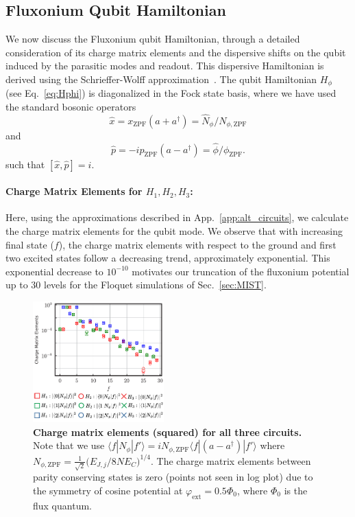 \documentclass[%
reprint,
superscriptaddress,
 amsmath,amssymb,
 aps,
 prx,
longbibliography,
floatfix,
]{revtex4-2}
\newcommand{\sh}[1]{{\color{blue}{{}[SS: #1]}}}%
\begin{document}
\subsection{Fluxonium Qubit Hamiltonian}
\sh{check for units to be $\hbar=1$}
We now discuss the Fluxonium qubit Hamiltonian, through a detailed consideration of its charge matrix elements and the dispersive shifts on the qubit induced by the parasitic modes and readout. This dispersive Hamiltonian is derived using the Schrieffer-Wolff approximation~\cite{viola2015collective}. The qubit Hamiltonian $H_{\phi}$ (see Eq.~\ref{eq:Hphi}) is diagonalized in the Fock state basis, where we have used the standard bosonic operators
 \begin{equation} \hat x=x_{\mathrm{ZPF}}(a+a^\dagger)=\hat N_{\phi}/ N_{\phi,\mathrm{ZPF}}
 \end{equation}
 and 
 \begin{equation} \hat p=-ip_{\mathrm{ZPF}}(a-a^\dagger)=\hat \phi/\phi_{\mathrm{ZPF}}.
 \end{equation}
such that $[\hat x,\hat p]=i$.
\paragraph{Charge Matrix Elements for $H_1,H_2,H_3$:}
Here, using the approximations described in App.~\ref{app:alt_circuits}, we calculate the charge matrix elements for the qubit mode. We observe that with increasing final state ($f$), the charge matrix elements with respect to the ground and first two excited states follow a decreasing trend, approximately exponential. This exponential decrease to $10^{-10}$ motivates our truncation of the fluxonium potential up to $30$ levels for the Floquet simulations of Sec.~\ref{sec:MIST}.
\begin{figure}[hbt]
    \centering
\includegraphics[width=0.45\textwidth]{Supp_Fig/Charge_Matrix.pdf}
    \caption{{\bf Charge matrix 
 elements (squared) for all three circuits.} Note that we use $\langle f|N_\phi|f'\rangle=iN_{\phi,\mathrm{ZPF}}\langle f|(a-a^\dagger)|f'\rangle$ where $N_{\phi,\mathrm{ZPF}}=\frac{1}{\sqrt{2}}\Big(E_{J,j}/8NE_C\Big)^{1/4}$. The charge matrix elements between parity conserving states is zero (points not seen in log plot) due to the symmetry of cosine potential at $\varphi_\mathrm{ext}=0.5\Phi_0$, where $\Phi_0$ is the flux quantum.}
    \label{charge-matrix}
\end{figure}
\end{document}
